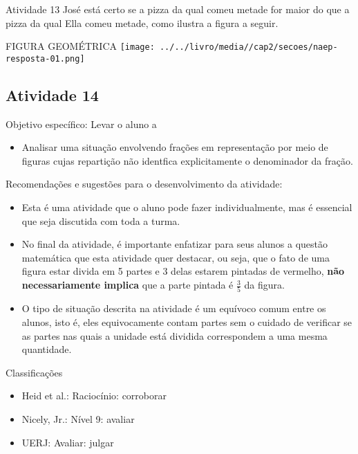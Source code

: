 \documentclass[oneside]{book}
\begin{document}
\begin{multicols}{2}
\begin{resposta*}{Atividade 13}
  José está certo se a pizza da qual comeu metade for maior do que a pizza da qual Ella comeu metade, como ilustra a figura a seguir.
  \begin{imagem*}[breakable]{}{}     FIGURA GEOMÉTRICA
        \texttt{[image: ../../livro/media//cap2/secoes/naep-resposta-01.png]}
  \end{imagem*}
\end{resposta*}



\subsection{Atividade 14}




  Objetivo específico: Levar o aluno a
\begin{itemize} %
    \item       Analisar uma situação envolvendo frações em representação por meio de figuras cujas repartição não identfica explicitamente o denominador da fração.
\end{itemize} %


  Recomendações e sugestões para o desenvolvimento da atividade:
\begin{itemize} %
    \item       Esta é uma atividade que o aluno pode fazer individualmente, mas é essencial que seja discutida com toda a turma.
    \item       No final da atividade, é importante enfatizar para seus alunos a questão matemática que esta atividade quer destacar, ou seja, que o fato de uma figura estar divida em 5 partes e 3 delas estarem pintadas de vermelho,       {\bf não necessariamente implica}       que a parte pintada é       $\frac{3}{5}$       da figura.
    \item       O tipo de situação descrita na atividade é um equívoco comum entre os alunos, isto é, eles equivocamente contam partes sem o cuidado de verificar se as partes nas quais a unidade está dividida correspondem a uma mesma quantidade.
\end{itemize} %


  Classificações
\begin{itemize} %
    \item       Heid et al.: Raciocínio: corroborar
    \item       Nicely, Jr.: Nível 9: avaliar
    \item       UERJ: Avaliar: julgar
\end{itemize} %




\end{multicols}
\end{document}
